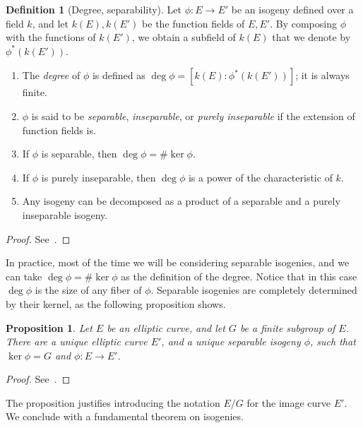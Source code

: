 \documentclass[10pt]{article}
\theoremstyle{plain}
\newtheorem{proposition}[theorem]{Proposition}
\theoremstyle{definition}
\newtheorem{definition}[theorem]{Definition}
\begin{document}
\begin{definition}[Degree, separability]
  Let $ϕ:E\to E'$ be an isogeny defined over a field $k$, and let
  $k(E),k(E')$ be the function fields of $E,E'$. %
  By composing $\phi$ with the functions of $k(E')$, we obtain a
  subfield of $k(E)$ that we denote by $ϕ^\ast(k(E'))$.

  \begin{enumerate}
  \item The \emph{degree} of $ϕ$ is defined as
    $\deg ϕ = [k(E):ϕ^\ast(k(E'))]$; it is always finite.
  \item $ϕ$ is said to be \emph{separable}, \emph{inseparable}, or
    \emph{purely inseparable} if the extension of function fields is.
  \item If $ϕ$ is separable, then $\deg ϕ = \#\ker ϕ$.
  \item If $ϕ$ is purely inseparable, then $\deg ϕ$ is a power of the
    characteristic of $k$.
  \item Any isogeny can be decomposed as a product of a separable and
    a purely inseparable isogeny.
  \end{enumerate}
\end{definition}
\begin{proof}
  See~\cite[II, Th.~2.4]{silverman:elliptic}.
\end{proof}

In practice, most of the time we will be considering separable
isogenies, and we can take $\deg ϕ = \#\ker ϕ$ as the definition of
the degree. %
Notice that in this case $\deg ϕ$ is the size of any fiber of $ϕ$. %
Separable isogenies are completely determined by their kernel, as the
following proposition shows.

\begin{proposition}
  Let $E$ be an elliptic curve, and let $G$ be a finite subgroup of
  $E$. %
  There are a unique elliptic curve $E'$, and a unique separable
  isogeny $ϕ$, such that $\ker ϕ=G$ and $ϕ:E\to E'$. %
\end{proposition}
\begin{proof}
  See~\cite[Prop.~III, 4.12]{silverman:elliptic}.
\end{proof}

The proposition justifies introducing the notation $E/G$ for the image
curve $E'$. %
We conclude with a fundamental theorem on isogenies.
\end{document}
